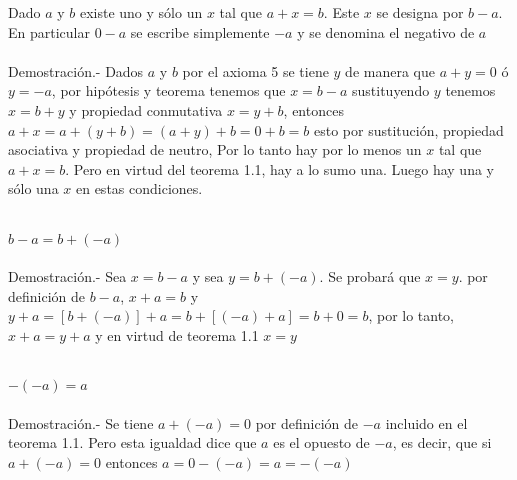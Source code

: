 \begin{teo}
Dado $a$ y $b$ existe uno y sólo un $x$ tal que $a+x=b$. Este $x$ se designa por $b-a$. En particular $0-a$ se escribe simplemente $-a$ y se denomina el negativo de $a$\\\\
Demostración.- \;
Dados $a$ y $b$ por el axioma 5 se tiene $y$ de manera que $a + y = 0$ ó $y=-a$, por hipótesis y teorema tenemos que $x=b-a$ sustituyendo $y$ tenemos $x=b+y$ y propiedad conmutativa $x=y+b$, entonces $a+x=a+(y+b)=(a+y)+b=0+b=b$ esto por sustitución, propiedad asociativa y propiedad de neutro, Por lo tanto hay por lo menos un $x$ tal que $a+x=b$. Pero en virtud del teorema 1.1, hay a lo sumo una. Luego hay una y sólo una $x$ en estas condiciones.\\\\ 
\end{teo}

\begin{teo}
$b-a=b+(-a)$\\\\
Demostración.- \; Sea $x=b-a$ y sea $y=b+(-a)$. Se probará que $x=y$. por definición de $b-a$, $x+a=b$ y $y+a=\left[ b+(-a)\right]+a=b+\left[ (-a)+a \right]=b+0=b$, por lo tanto, $x+a=y+a$ y en virtud de teorema 1.1 $x=y$\\\\
\end{teo}

\begin{teo}
$-(-a)=a$\\\\
Demostración.- \;
Se tiene $a+(-a)=0$ por definición de $-a$ incluido en el teorema 1.1. Pero esta igualdad dice que $a$ es el opuesto de $-a$, es decir, que si $a+(-a)=0$ entonces $a=0-(-a)=a=-(-a)$\\\\
\end{teo}

